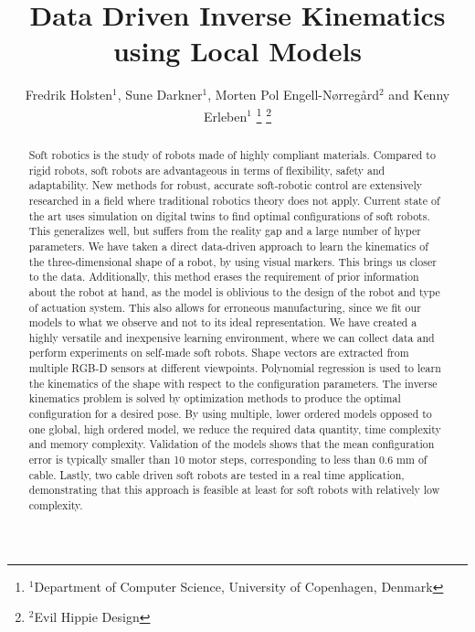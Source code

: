 \documentclass[letterpaper, 10 pt, conference]{ieeeconf}  %
\title{\LARGE \bf
Data Driven Inverse Kinematics using Local Models
}
\author{Fredrik Holsten$^{1}$, Sune Darkner$^{1}$, Morten Pol Engell-Nørregård$^{2}$ and Kenny Erleben$^{1}$%
\thanks{$^{1}$Department of Computer Science, University of Copenhagen, Denmark}%
\thanks{$^{2}$Evil Hippie Design}%
}
\begin{document}
\maketitle
\thispagestyle{empty}
\pagestyle{empty}


\begin{abstract}
Soft robotics is the study of robots made of highly compliant materials. Compared to rigid robots, soft robots are advantageous in terms of flexibility, safety and adaptability. New methods for robust, accurate soft-robotic control are extensively researched in a field where traditional robotics theory does not apply. Current state of the art uses simulation on digital twins to find optimal configurations of soft robots. This generalizes well, but suffers from the reality gap and a large number of hyper parameters. We have taken a direct data-driven approach to learn the kinematics of the three-dimensional shape of a robot, by using visual markers. This brings us closer to the data. Additionally, this method erases the requirement of prior information about the robot at hand, as the model is oblivious to the design of the robot and type of actuation system. This also allows for erroneous manufacturing, since we fit our models to what we observe and not to its ideal representation. We have created a highly versatile and inexpensive learning environment, where we can collect data and perform experiments on self-made soft robots. Shape vectors are extracted from multiple RGB-D sensors at different viewpoints. Polynomial regression is used to learn the kinematics of the shape with respect to the configuration parameters. The inverse kinematics problem is solved by optimization methods to produce the optimal configuration for a desired pose. By using multiple, lower ordered models opposed to one global, high ordered model, we reduce the required data quantity, time complexity and memory complexity. Validation of the models shows that the mean configuration error is typically smaller than 10 motor steps, corresponding to less than 0.6 mm of cable. Lastly, two cable driven soft robots are tested in a real time application, demonstrating that this approach is feasible at least for soft robots with relatively low complexity.

\end{abstract}
\end{document}
